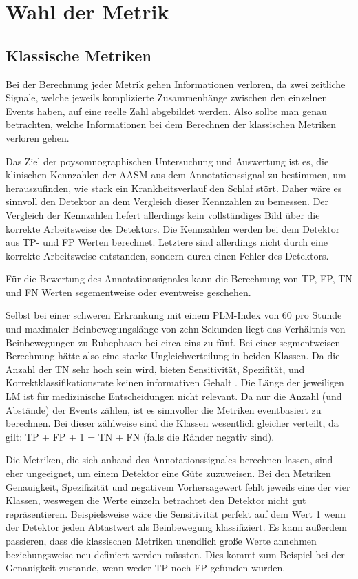 \chapter{Wahl der Metrik}\label{chap:Wahl_der_Metrik}
\section{Klassische Metriken}
Bei der Berechnung jeder Metrik gehen Informationen verloren, da zwei zeitliche Signale, welche jeweils komplizierte Zusammenhänge zwischen den einzelnen Events haben, auf eine reelle Zahl abgebildet werden. 
Also sollte man genau betrachten, welche Informationen bei dem Berechnen der klassischen Metriken verloren gehen.

Das Ziel der poysomnographischen Untersuchung und Auswertung ist es, die klinischen Kennzahlen der AASM \cite{AASM} aus dem Annotationssignal zu bestimmen, um herauszufinden, wie stark ein Krankheitsverlauf den Schlaf stört. Daher wäre es sinnvoll den Detektor an dem Vergleich dieser Kennzahlen zu bemessen.
Der Vergleich der Kennzahlen liefert allerdings kein vollständiges Bild über die korrekte Arbeitsweise des Detektors. Die Kennzahlen werden bei dem Detektor aus \gls{TP}- und \acrfull{FP} Werten berechnet. Letztere sind allerdings nicht durch eine korrekte Arbeitsweise entstanden, sondern durch einen Fehler des Detektors.


Für die Bewertung des Annotationssignales kann die Berechnung von \gls{TP}, \gls{FP}, \gls{TN} und \gls{FN} Werten segementweise oder eventweise geschehen. 

Selbst bei einer schweren Erkrankung mit einem PLM-Index von 60 pro Stunde \cite{PDS} und maximaler Beinbewegungslänge von zehn Sekunden liegt das Verhältnis von Beinbewegungen zu Ruhephasen bei circa eins zu fünf. Bei einer segmentweisen Berechnung hätte also eine starke Ungleichverteilung in beiden Klassen. Da die Anzahl der TN sehr hoch sein wird, bieten Sensitivität, Spezifität, und Korrektklassifikationsrate keinen informativen Gehalt \cite{Huang}. 
Die Länge der jeweiligen LM ist für medizinische Entscheidungen nicht relevant. Da nur die Anzahl (und Abstände) der Events zählen, ist es sinnvoller die Metriken eventbasiert zu berechnen.
Bei dieser zählweise sind die Klassen wesentlich gleicher verteilt, da gilt: TP + FP + 1 = TN + FN (falls die Ränder negativ sind). 

Die Metriken, die sich anhand des Annotationssignales berechnen lassen, sind eher ungeeignet, um einem Detektor eine Güte zuzuweisen. Bei den Metriken Genauigkeit, Spezifizität und negativem Vorhersagewert fehlt jeweils eine der vier Klassen, weswegen die Werte einzeln betrachtet den Detektor nicht gut repräsentieren. Beispielsweise wäre die Sensitivität perfekt auf dem Wert 1 wenn der Detektor jeden Abtastwert als Beinbewegung klassifiziert. 
Es kann außerdem passieren, dass die klassischen Metriken unendlich große Werte annehmen beziehungsweise neu definiert werden müssten.
Dies kommt zum Beispiel bei der Genauigkeit zustande, wenn weder TP noch FP gefunden wurden. 

